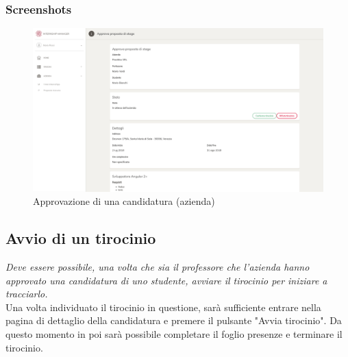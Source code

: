 \subsubsection{Screenshots}
\begin{figure}[H]
	\centering
	\includegraphics[width=1\textwidth]{Chapter3/Figs/screenshots/internshipproposalapprovecompany}     
	\caption[Screenshot: approvazione di una candidatura (azienda)]{Approvazione di una candidatura (azienda)}
	\label{fig:screenshot:6}
\end{figure}

\pagebreak
\subsection{Avvio di un tirocinio}\label{sec:avvio-di-un-tirocinio}

\textit{Deve essere possibile, una volta che sia il professore che l'azienda hanno approvato una candidatura di uno studente, avviare il tirocinio per iniziare a tracciarlo.} \\

\noindent
Una volta individuato il tirocinio in questione, sarà sufficiente entrare nella pagina di dettaglio della candidatura e premere il pulsante "Avvia tirocinio". Da questo momento in poi sarà possibile completare il foglio presenze e terminare il tirocinio.

